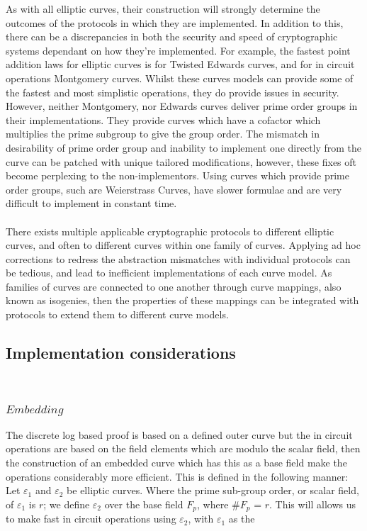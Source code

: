 \documentclass{article}
\begin{document}
As with all elliptic curves, their construction will strongly determine the outcomes of the protocols in which they are implemented. In addition to this, there can be a discrepancies in both the security and speed of cryptographic systems dependant on how they're implemented. For example, the fastest point addition laws for elliptic curves is for Twisted Edwards curves, and for in circuit operations Montgomery curves. Whilst these curves models can provide some of the fastest and most simplistic operations, they do provide issues in security. However, neither Montgomery, nor Edwards curves deliver prime order groups in their implementations. They provide curves which have a cofactor which multiplies the prime subgroup to give the group order. The mismatch in desirability of prime order group and inability to implement one directly from the curve can be patched with unique tailored modifications, however, these fixes oft become perplexing to the non-implementors. Using curves which provide prime order groups, such are Weierstrass Curves, have slower formulae and are very difficult to implement in constant time. \\\\ 
There exists multiple applicable cryptographic protocols to different elliptic curves, and often to different curves within one family of curves. Applying ad hoc corrections to redress the abstraction mismatches with individual protocols can be tedious, and lead to inefficient implementations of each curve model. As families of curves are connected to one another through curve mappings, also known as isogenies, then the properties of these mappings can be integrated with protocols to extend them to different curve models.




\subsection{Implementation considerations}
\\ \subsubsection{$Embedding$}
The discrete log based proof is based on a defined outer curve but the in circuit operations are based on the field elements which are modulo the scalar field, then the construction of an embedded curve which has this as a base field make the operations considerably more efficient. This is defined in the following manner: Let $\varepsilon_{1}$ and $\varepsilon_{2}$ be elliptic curves. Where the prime sub-group order, or scalar field, of $\varepsilon_{1}$ is $r$; we define $\varepsilon_{2}$ over the base field $F_p$, where \#$F_p$ = $r$.
This will allows us to make fast in circuit operations using $\varepsilon_{2}$, with  $\varepsilon_{1}$ as the 
\end{document}

